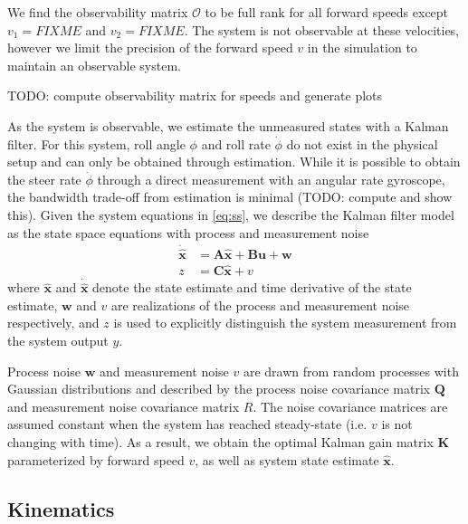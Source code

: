 \documentclass[11pt,a4paper,reqno]{amsart}
\newcommand{\sysInput}{\bm{u}}
\newcommand{\sysOutput}{y}
\newcommand{\stateMat}{\bm{A}}
\newcommand{\inputMat}{\bm{B}}
\newcommand{\outputMat}{\bm{C}}
\newcommand{\dstateEst}{\dot{\hat{\bm{x}}}}
\newcommand{\stateEst}{\hat{\bm{x}}}
\newcommand{\meas}{z}
\newcommand{\processCov}{\bm{Q}}
\newcommand{\processNoise}{\bm{w}}
\newcommand{\measCov}{R}
\newcommand{\measNoise}{v}
\newcommand{\kalmanGain}{\bm{K}}
\newcommand{\estimateCov}{\bm{P}}
\newcommand{\roll}{\phi}
\newcommand{\rollRate}{\dot{\phi}}
\newcommand{\steerRate}{\dot{\phi}}
\begin{document}
We find the observability matrix $ \bm{\mathcal{O}} $ to be full rank for all forward speeds except
$ v_1 = FIXME $ and $ v_2 = FIXME $.
The system is not observable at these velocities, however we limit the precision of the forward speed $ v $ in the
simulation to maintain an observable system.

TODO: compute observability matrix for speeds and generate plots


As the system is observable, we estimate the unmeasured states with a Kalman filter.
For this system, roll angle $ \roll $ and roll rate $ \rollRate $ do not exist in the physical setup and can only be
obtained through estimation.
While it is possible to obtain the steer rate $ \steerRate $ through a direct measurement with an angular rate
gyroscope, the bandwidth trade-off from estimation is minimal (TODO: compute and show this).
Given the system equations in \autoref{eq:ss}, we describe the Kalman filter model as the state space equations with
process and measurement noise
\begin{equation}
\begin{aligned}
    \dstateEst &= \stateMat \stateEst + \inputMat \sysInput + \processNoise \\
    \meas &= \outputMat \stateEst + \measNoise \label{eq:kalman_ss}
\end{aligned}
\end{equation}
where $ \stateEst $ and $ \dstateEst $ denote the state estimate and time derivative of the state estimate,
$ \processNoise $ and $ \measNoise $ are realizations of the process and measurement noise respectively,
and $ \meas $ is used to explicitly distinguish the system measurement from the system output $ \sysOutput $.

Process noise $ \processNoise $ and measurement noise $ \measNoise $ are drawn from random processes with
Gaussian distributions and described by the
process noise covariance matrix $ \processCov $ and measurement noise covariance matrix $ \measCov $.
The noise covariance matrices are assumed constant when the system has reached steady-state
(i.e. $ v $ is not changing with time). %
As a result, we obtain the optimal Kalman gain matrix $ \kalmanGain $
parameterized by forward speed $ v $, as well as system state estimate $ \stateEst $.

\subsection{Kinematics}
\end{document}
